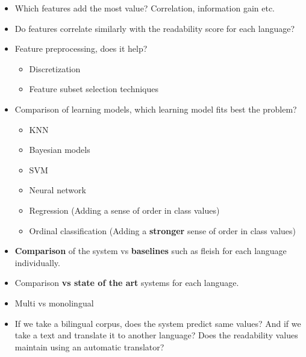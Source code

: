 \documentclass[12pt]{article}
\begin{document}
\begin{itemize}

\item Which features add the most value? Correlation, information gain etc.

\item Do features correlate similarly with the readability score for each language?

\item Feature preprocessing, does it help?
	\begin{itemize}
	\item Discretization
	\item Feature subset selection techniques
	\end{itemize}
	
\item Comparison of learning models, which learning model fits best the problem?
	\begin{itemize}
	\item KNN
	\item Bayesian models
	\item SVM
	\item Neural network
	\item Regression (Adding a sense of order in class values)
	\item Ordinal classification (Adding a \textbf{stronger} sense of order in class values)
	\end{itemize}

\item \textbf{Comparison} of the system vs \textbf{baselines} such as fleish for each language individually.

\item Comparison \textbf{vs state of the art} systems for each language.

\item Multi vs monolingual
\item If we take a bilingual corpus, does the system predict same values? And if we take a text and translate it to another language? Does the readability values maintain using an automatic translator?
\end{itemize}



{}

\end{document}
